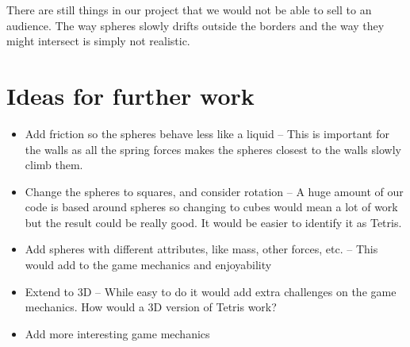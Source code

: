 \documentclass[11pt]{article} %
\begin{document}
There are still things in our project that we would not be able to sell to an audience. The way spheres slowly drifts outside the borders and the way they might intersect is simply not realistic. 

\section{Ideas for further work}
\begin{itemize}
\item{Add friction so the spheres behave less like a liquid -- This is important for the walls as all the spring forces makes the spheres closest to the walls slowly climb them.}
\item{Change the spheres to squares, and consider rotation -- A huge amount of our code is based around spheres so changing to cubes would mean a lot of work but the result could be really good. It would be easier to identify it as Tetris.}
\item{Add spheres with different attributes, like mass, other forces, etc. -- This would add to the game mechanics and enjoyability}
\item{Extend to 3D -- While easy to do it would add extra challenges on the game mechanics. How would a 3D version of Tetris work?}
\item{Add more interesting game mechanics}
\end{itemize}
\end{document}
